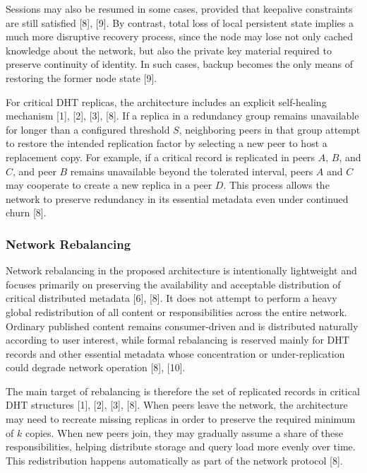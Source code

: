\documentclass[12pt,a4paper]{article}
\begin{document}
Sessions may also be resumed in some cases, provided that keepalive constraints are still satisfied [8], [9]. By contrast, total loss of local persistent state implies a much more disruptive recovery process, since the node may lose not only cached knowledge about the network, but also the private key material required to preserve continuity of identity. In such cases, backup becomes the only means of restoring the former node state [9].

For critical DHT replicas, the architecture includes an explicit self-healing mechanism [1], [2], [3], [8]. If a replica in a redundancy group remains unavailable for longer than a configured threshold \(S\), neighboring peers in that group attempt to restore the intended replication factor by selecting a new peer to host a replacement copy. For example, if a critical record is replicated in peers \(A\), \(B\), and \(C\), and peer \(B\) remains unavailable beyond the tolerated interval, peers \(A\) and \(C\) may cooperate to create a new replica in a peer \(D\). This process allows the network to preserve redundancy in its essential metadata even under continued churn [8].

\subsubsection{Network Rebalancing}

Network rebalancing in the proposed architecture is intentionally lightweight and focuses primarily on preserving the availability and acceptable distribution of critical distributed metadata [6], [8]. It does not attempt to perform a heavy global redistribution of all content or responsibilities across the entire network. Ordinary published content remains consumer-driven and is distributed naturally according to user interest, while formal rebalancing is reserved mainly for DHT records and other essential metadata whose concentration or under-replication could degrade network operation [8], [10].

The main target of rebalancing is therefore the set of replicated records in critical DHT structures [1], [2], [3], [8]. When peers leave the network, the architecture may need to recreate missing replicas in order to preserve the required minimum of \(k\) copies. When new peers join, they may gradually assume a share of these responsibilities, helping distribute storage and query load more evenly over time. This redistribution happens automatically as part of the network protocol [8].
\end{document}
